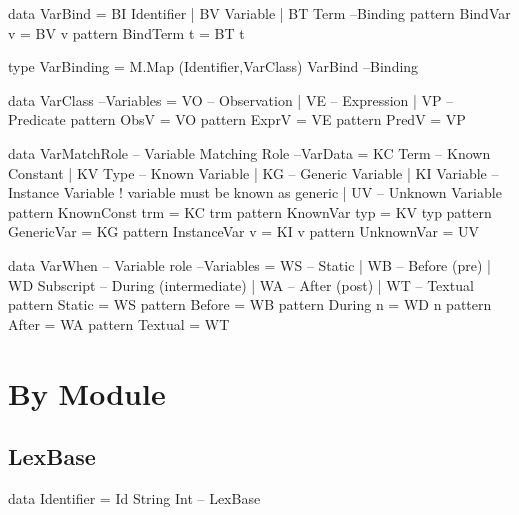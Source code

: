 \begin{code}
data VarBind = BI Identifier | BV Variable | BT Term                 --Binding
pattern BindVar  v  =  BV v
pattern BindTerm t  =  BT t
\end{code}

\begin{code}
type VarBinding = M.Map (Identifier,VarClass) VarBind                --Binding
\end{code}

\begin{code}
data VarClass                                                     --Variables
  = VO -- Observation
  | VE -- Expression
  | VP -- Predicate
pattern ObsV  = VO
pattern ExprV = VE
pattern PredV = VP
\end{code}

\begin{code}
data VarMatchRole -- Variable Matching Role                          --VarData
  =  KC Term     -- Known Constant
  |  KV Type     -- Known Variable
  |  KG          -- Generic Variable
  |  KI Variable -- Instance Variable ! variable must be known as generic
  |  UV          -- Unknown Variable
pattern KnownConst trm = KC trm
pattern KnownVar typ   = KV typ
pattern GenericVar     = KG
pattern InstanceVar v  = KI v
pattern UnknownVar     = UV
\end{code}


\begin{code}
data VarWhen -- Variable role                                      --Variables
  = WS            --  Static
  | WB            --  Before (pre)
  | WD Subscript  --  During (intermediate)
  | WA            --  After (post)
  | WT            --  Textual
pattern Static    =  WS
pattern Before    =  WB
pattern During n  =  WD n
pattern After     =  WA
pattern Textual   =  WT
\end{code}

\section{By Module}

\subsection{LexBase}

\begin{code}
data Identifier = Id String Int                                    -- LexBase
\end{code}


